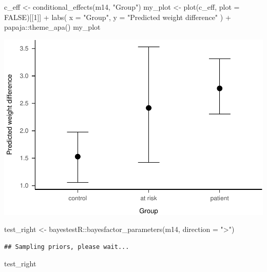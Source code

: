 \documentclass[
]{article}
\newenvironment{Shaded}{\begin{snugshade}}{\end{snugshade}}
\newcommand{\AttributeTok}[1]{\textcolor[rgb]{0.77,0.63,0.00}{#1}}
\newcommand{\ConstantTok}[1]{\textcolor[rgb]{0.00,0.00,0.00}{#1}}
\newcommand{\DecValTok}[1]{\textcolor[rgb]{0.00,0.00,0.81}{#1}}
\newcommand{\FunctionTok}[1]{\textcolor[rgb]{0.00,0.00,0.00}{#1}}
\newcommand{\NormalTok}[1]{#1}
\newcommand{\OtherTok}[1]{\textcolor[rgb]{0.56,0.35,0.01}{#1}}
\newcommand{\SpecialCharTok}[1]{\textcolor[rgb]{0.00,0.00,0.00}{#1}}
\newcommand{\StringTok}[1]{\textcolor[rgb]{0.31,0.60,0.02}{#1}}
\begin{document}
\begin{Shaded}
\begin{Highlighting}[]
\NormalTok{c\_eff }\OtherTok{\textless{}{-}} \FunctionTok{conditional\_effects}\NormalTok{(m14, }\StringTok{"Group"}\NormalTok{)}
\NormalTok{my\_plot }\OtherTok{\textless{}{-}} \FunctionTok{plot}\NormalTok{(c\_eff, }\AttributeTok{plot =} \ConstantTok{FALSE}\NormalTok{)[[}\DecValTok{1}\NormalTok{]] }\SpecialCharTok{+}
  \FunctionTok{labs}\NormalTok{(}
    \AttributeTok{x =} \StringTok{"Group"}\NormalTok{,}
    \AttributeTok{y =} \StringTok{"Predicted weight difference"}
\NormalTok{  ) }\SpecialCharTok{+}
\NormalTok{  papaja}\SpecialCharTok{::}\FunctionTok{theme\_apa}\NormalTok{()}
\NormalTok{my\_plot}
\end{Highlighting}
\end{Shaded}

\includegraphics{046_weight_history_alpha_files/figure-latex/unnamed-chunk-16-1.pdf}

\begin{Shaded}
\begin{Highlighting}[]
\NormalTok{test\_right }\OtherTok{\textless{}{-}}\NormalTok{ bayestestR}\SpecialCharTok{::}\FunctionTok{bayesfactor\_parameters}\NormalTok{(m14, }\AttributeTok{direction =} \StringTok{"\textgreater{}"}\NormalTok{)}
\end{Highlighting}
\end{Shaded}

\begin{verbatim}
## Sampling priors, please wait...
\end{verbatim}

\begin{Shaded}
\begin{Highlighting}[]
\NormalTok{test\_right}
\end{Highlighting}
\end{Shaded}
\end{document}
